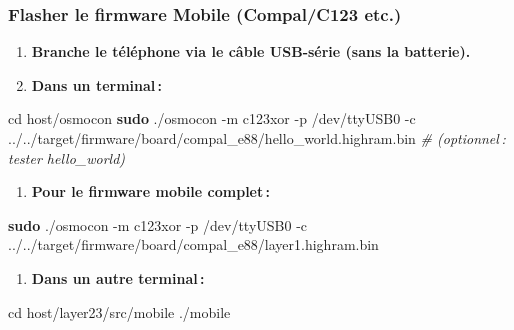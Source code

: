 \documentclass[
  french,
]{article}
\newenvironment{Shaded}{\begin{snugshade}}{\end{snugshade}}
\newcommand{\AttributeTok}[1]{\textcolor[rgb]{0.13,0.29,0.53}{#1}}
\newcommand{\BuiltInTok}[1]{#1}
\newcommand{\CommentTok}[1]{\textcolor[rgb]{0.56,0.35,0.01}{\textit{#1}}}
\newcommand{\ExtensionTok}[1]{#1}
\newcommand{\FunctionTok}[1]{\textcolor[rgb]{0.13,0.29,0.53}{\textbf{#1}}}
\newcommand{\NormalTok}[1]{#1}
\providecommand{\tightlist}{%
  \setlength{\itemsep}{0pt}\setlength{\parskip}{0pt}}
\begin{document}
\subsubsection{Flasher le firmware Mobile (Compal/C123
etc.)}\label{flasher-le-firmware-mobile-compalc123-etc.}

\begin{enumerate}
\def\labelenumi{\arabic{enumi}.}
\item
  \textbf{Branche le téléphone via le câble USB-série (sans la
  batterie).}
\item
  \textbf{Dans un terminal\,:}
\end{enumerate}

\begin{Shaded}
\begin{Highlighting}[]
\BuiltInTok{cd}\NormalTok{ host/osmocon}
\FunctionTok{sudo}\NormalTok{ ./osmocon }\AttributeTok{{-}m}\NormalTok{ c123xor }\AttributeTok{{-}p}\NormalTok{ /dev/ttyUSB0 }\AttributeTok{{-}c}\NormalTok{ ../../target/firmware/board/compal\_e88/hello\_world.highram.bin}
\CommentTok{\# (optionnel : tester hello\_world)}
\end{Highlighting}
\end{Shaded}

\begin{enumerate}
\def\labelenumi{\arabic{enumi}.}
\setcounter{enumi}{2}
\tightlist
\item
  \textbf{Pour le firmware mobile complet\,:}
\end{enumerate}

\begin{Shaded}
\begin{Highlighting}[]
\FunctionTok{sudo}\NormalTok{ ./osmocon }\AttributeTok{{-}m}\NormalTok{ c123xor }\AttributeTok{{-}p}\NormalTok{ /dev/ttyUSB0 }\AttributeTok{{-}c}\NormalTok{ ../../target/firmware/board/compal\_e88/layer1.highram.bin}
\end{Highlighting}
\end{Shaded}

\begin{enumerate}
\def\labelenumi{\arabic{enumi}.}
\setcounter{enumi}{3}
\tightlist
\item
  \textbf{Dans un autre terminal\,:}
\end{enumerate}

\begin{Shaded}
\begin{Highlighting}[]
\BuiltInTok{cd}\NormalTok{ host/layer23/src/mobile}
\ExtensionTok{./mobile}
\end{Highlighting}
\end{Shaded}
\end{document}
